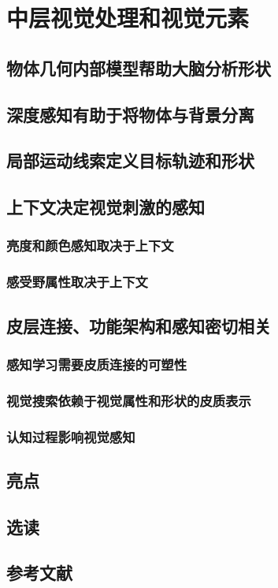 \chapter{中层视觉处理和视觉元素}

\section{物体几何内部模型帮助大脑分析形状}

\section{深度感知有助于将物体与背景分离}

\section{局部运动线索定义目标轨迹和形状}

\section{上下文决定视觉刺激的感知}
\subsection{亮度和颜色感知取决于上下文}
\subsection{感受野属性取决于上下文}

\section{皮层连接、功能架构和感知密切相关}
\subsection{感知学习需要皮质连接的可塑性}
\subsection{视觉搜索依赖于视觉属性和形状的皮质表示}
\subsection{认知过程影响视觉感知}

\section{亮点}
\section{选读}
\section{参考文献}